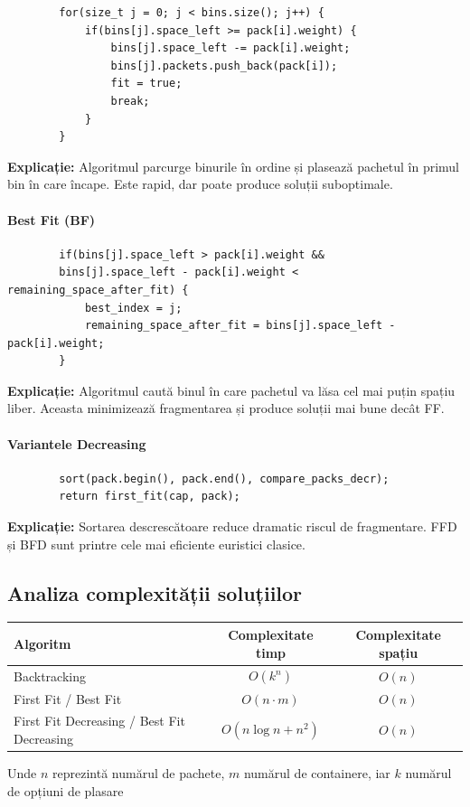 \documentclass[runningheads]{llncs}
\begin{document}
	\begin{verbatim}
		for(size_t j = 0; j < bins.size(); j++) {
			if(bins[j].space_left >= pack[i].weight) {
				bins[j].space_left -= pack[i].weight;
				bins[j].packets.push_back(pack[i]);
				fit = true;
				break;
			}
		}
	\end{verbatim}

	\textbf{Explicație:}
	Algoritmul parcurge binurile în ordine și plasează pachetul în primul bin în care încape.
	Este rapid, dar poate produce soluții suboptimale.

	\paragraph{\Large Best Fit (BF)}

	\begin{verbatim}
		if(bins[j].space_left > pack[i].weight &&
		bins[j].space_left - pack[i].weight < remaining_space_after_fit) {
			best_index = j;
			remaining_space_after_fit = bins[j].space_left - pack[i].weight;
		}
	\end{verbatim}

	\textbf{Explicație:}
	Algoritmul caută binul în care pachetul va lăsa cel mai puțin spațiu liber.
	Aceasta minimizează fragmentarea și produce soluții mai bune decât FF.

	\paragraph{\Large Variantele Decreasing}

	\begin{verbatim}
		sort(pack.begin(), pack.end(), compare_packs_decr);
		return first_fit(cap, pack);
	\end{verbatim}

	\textbf{Explicație:}
	Sortarea descrescătoare reduce dramatic riscul de fragmentare.
	FFD și BFD sunt printre cele mai eficiente euristici clasice.

	\subsection{Analiza complexității soluțiilor}

	\begin{center}
		\begin{tabular}{|l|c|c|}
			\hline
		\textbf{Algoritm} & \textbf{Complexitate timp} & \textbf{Complexitate spațiu} \\
			\hline
				Backtracking & $O(k^n)$ & $O(n)$ \\
			\hline
				First Fit / Best Fit & $O(n \cdot m)$ & $O(n)$ \\
			\hline
				First Fit Decreasing / Best Fit Decreasing & $O(n \log n + n^2)$ & $O(n)$ \\
			\hline
		\end{tabular}
	\end{center}
	{Unde $n$ reprezintă numărul de pachete, $m$ numărul de containere, iar $k$ numărul de opțiuni de plasare}
\end{document}
